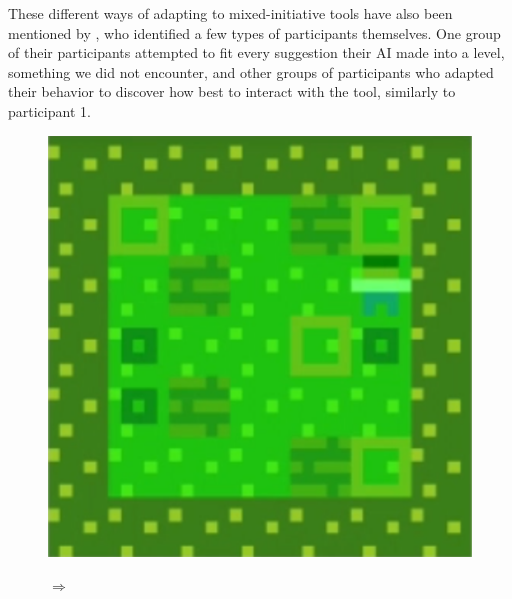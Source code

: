 These different ways of adapting to mixed-initiative tools have also been mentioned by \cite{Guzdial}, who identified a few types of participants themselves.
One group of their participants attempted to fit every suggestion their AI made into a level, something we did not encounter, and other groups of participants who adapted their behavior to discover how best to interact with the tool, similarly to participant 1.

\begin{figure}[!htbp]
\centering
\begin{minipage}[t]{0.25\textwidth}
\includegraphics[width=\textwidth]{figures/part5i1_cropped.png} \hfill \\
\end{minipage}
$\Longrightarrow$
\begin{minipage}[t]{0.25\textwidth}

\end{minipage}
\end{figure}
